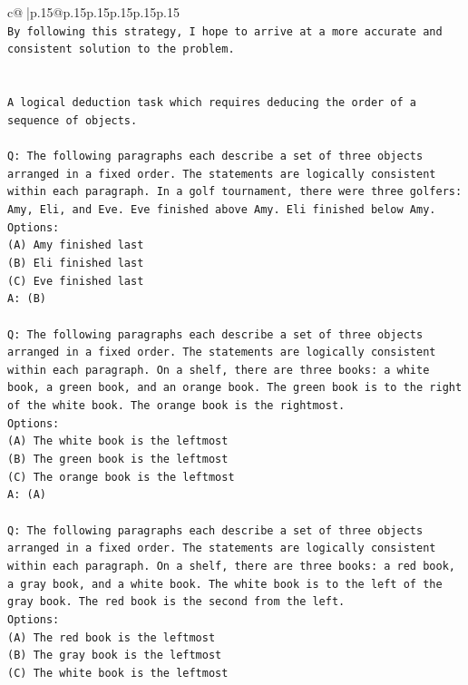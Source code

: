 \documentclass{article}
\begin{document}
{\begin{supertabular}{c@{$\;$}|p{.15\linewidth}@{}p{.15\linewidth}p{.15\linewidth}p{.15\linewidth}p{.15\linewidth}p{.15\linewidth}}
{{{\\ 
\texttt{By following this strategy, I hope to arrive at a more accurate and consistent solution to the problem.} \\
\\ 
\\ 
\texttt{A logical deduction task which requires deducing the order of a sequence of objects.} \\
\\ 
\texttt{Q: The following paragraphs each describe a set of three objects arranged in a fixed order. The statements are logically consistent within each paragraph. In a golf tournament, there were three golfers: Amy, Eli, and Eve. Eve finished above Amy. Eli finished below Amy.} \\
\texttt{Options:} \\
\texttt{(A) Amy finished last} \\
\texttt{(B) Eli finished last} \\
\texttt{(C) Eve finished last} \\
\texttt{A: (B)} \\
\\ 
\texttt{Q: The following paragraphs each describe a set of three objects arranged in a fixed order. The statements are logically consistent within each paragraph. On a shelf, there are three books: a white book, a green book, and an orange book. The green book is to the right of the white book. The orange book is the rightmost.} \\
\texttt{Options:} \\
\texttt{(A) The white book is the leftmost} \\
\texttt{(B) The green book is the leftmost} \\
\texttt{(C) The orange book is the leftmost} \\
\texttt{A: (A)} \\
\\ 
\texttt{Q: The following paragraphs each describe a set of three objects arranged in a fixed order. The statements are logically consistent within each paragraph. On a shelf, there are three books: a red book, a gray book, and a white book. The white book is to the left of the gray book. The red book is the second from the left.} \\
\texttt{Options:} \\
\texttt{(A) The red book is the leftmost} \\
\texttt{(B) The gray book is the leftmost} \\
\texttt{(C) The white book is the leftmost} \\
}}}
\end{supertabular}}
\end{document}
